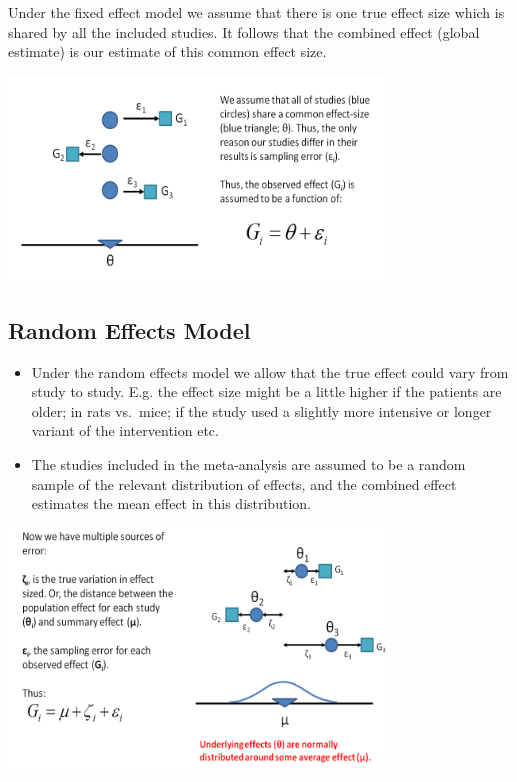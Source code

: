 \documentclass[
]{book}
\begin{document}
Under the fixed effect model we assume that there is one true effect size which is shared by all the included studies. It follows that the combined effect (global estimate) is our estimate of this common effect size.

\includegraphics[width=0.75\textwidth,height=\textheight]{figs/fixedeffects.png}

\hypertarget{random-effects-model}{%
\subsection{Random Effects Model}\label{random-effects-model}}

\begin{itemize}
\item
  Under the random effects model we allow that the true effect could vary from study to study. E.g. the effect size might be a little higher if the patients are older; in rats vs.~mice; if the study used a slightly more intensive or longer variant of the intervention etc.
\item
  The studies included in the meta-analysis are assumed to be a random sample of the relevant distribution of effects, and the combined effect estimates the mean effect in this distribution.
\end{itemize}

\includegraphics[width=0.75\textwidth,height=\textheight]{figs/randomeffects.png}
\end{document}
